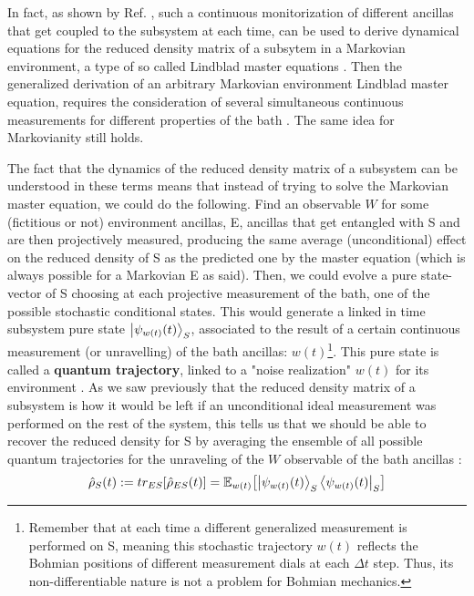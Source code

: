 \documentclass[11pt, a4paper]{article} %
\begin{document}
In fact, as shown by Ref. \cite{continousMeas}, such a continuous monitorization of different ancillas that get coupled to the subsystem at each time, can be used to derive dynamical equations for the reduced density matrix of a subsytem in a Markovian environment, a type of so called Lindblad master equations \cite{Generalized, MarkovianityDefs}. Then the generalized derivation of an arbitrary Markovian environment Lindblad master equation, requires the consideration of several simultaneous continuous measurements for different properties of the bath \cite{continousMeas, MarkovianityDefs}. The same idea for Markovianity still holds.

The fact that the dynamics of the reduced density matrix of a subsystem can be understood in these terms means that instead of trying to solve the Markovian master equation, we could do the following. Find an observable $W$ for some (fictitious or not) environment ancillas, E, ancillas that get entangled with S and are then projectively measured, producing the same average (unconditional) effect on the reduced density of S as the predicted one by the master equation (which is always possible for a Markovian E as said). Then, we could evolve a pure state-vector of S choosing at each projective measurement of the bath, one of the possible stochastic conditional states. This would generate a linked in time subsystem pure state $\ket{\psi_{w(t)}(t)}_S$, associated to the result of a certain continuous measurement (or unravelling) of the bath ancillas: $w(t)$\footnote{Remember that at each time a different generalized measurement is performed on S, meaning this stochastic trajectory $w(t)$ reflects the Bohmian positions of different measurement dials at each $\Delta t$ step. Thus, its non-differentiable nature is not a problem for Bohmian mechanics.}. This pure state is called a {\bf quantum trajectory}, linked to a "noise realization" $w(t)$ for its environment \cite{Generalized, MarkovianityDefs, QuantumTrajs}. As we saw previously that the reduced density matrix of a subsystem is how it would be left if an unconditional ideal measurement was performed on the rest of the system, this tells us that we should be able to recover the reduced density for S by averaging the ensemble of all possible quantum trajectories for the unraveling of the $W$ observable of the bath ancillas \cite{MarkovianityDefs,QuantumTrajs}:\vspace{-0.17cm}
\begin{equation}
\hat{\rho}_S(t):=tr_{ES}[\hat{\rho}_{ES}(t)]=\mathbb{E}_{w(t)}\qty[\ket{\psi_{w(t)}(t)}_S\bra{\psi_{w(t)}(t)}_S] \vspace{-0.13cm}
\end{equation}
\end{document}
